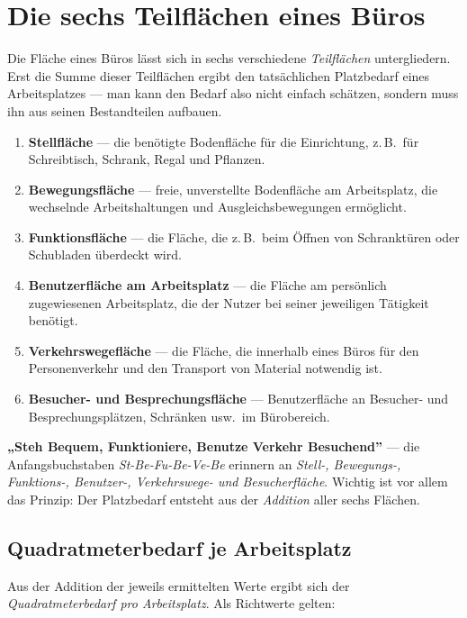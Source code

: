 \documentclass[11pt, a4paper]{article}
\begin{document}
\section{Die sechs Teilflächen eines Büros}

Die Fläche eines Büros lässt sich in sechs verschiedene \emph{Teilflächen} untergliedern.
Erst die Summe dieser Teilflächen ergibt den tatsächlichen Platzbedarf eines
Arbeitsplatzes --- man kann den Bedarf also nicht einfach schätzen, sondern muss ihn
aus seinen Bestandteilen aufbauen.

\begin{enumerate}
  \item \textbf{Stellfläche} --- die benötigte Bodenfläche für die Einrichtung, z.\,B.\ für
    Schreibtisch, Schrank, Regal und Pflanzen.
  \item \textbf{Bewegungsfläche} --- freie, unverstellte Bodenfläche am Arbeitsplatz, die
    wechselnde Arbeitshaltungen und Ausgleichsbewegungen ermöglicht.
  \item \textbf{Funktionsfläche} --- die Fläche, die z.\,B.\ beim Öffnen von Schranktüren
    oder Schubladen überdeckt wird.
  \item \textbf{Benutzerfläche am Arbeitsplatz} --- die Fläche am persönlich zugewiesenen
    Arbeitsplatz, die der Nutzer bei seiner jeweiligen Tätigkeit benötigt.
  \item \textbf{Verkehrswegefläche} --- die Fläche, die innerhalb eines Büros für den
    Personenverkehr und den Transport von Material notwendig ist.
  \item \textbf{Besucher- und Besprechungsfläche} --- Benutzerfläche an Besucher- und
    Besprechungsplätzen, Schränken usw.\ im Bürobereich.
\end{enumerate}

\begin{eselsbruecke}
\textbf{„Steh Bequem, Funktioniere, Benutze Verkehr Besuchend”} --- die Anfangs\-buch\-staben
\emph{St-Be-Fu-Be-Ve-Be} erinnern an \emph{Stell-, Bewegungs-, Funktions-, Benutzer-,
Verkehrswege- und Besucherfläche}. Wichtig ist vor allem das Prinzip: Der Platzbedarf
entsteht aus der \emph{Addition} aller sechs Flächen.
\end{eselsbruecke}

\subsection{Quadratmeterbedarf je Arbeitsplatz}

Aus der Addition der jeweils ermittelten Werte ergibt sich der \emph{Quadratmeterbedarf
pro Arbeitsplatz}. Als Richtwerte gelten:
\end{document}
